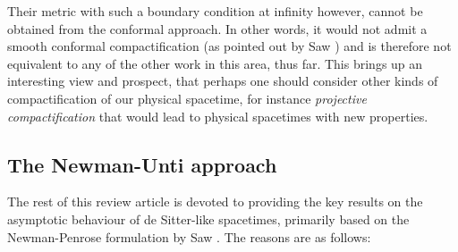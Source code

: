 \documentclass[aps,pre,preprint,superscriptaddress,showpacs,showkeys]{revtex4-1}
\begin{document}
Their metric with such a boundary condition at infinity however, cannot be obtained from the conformal approach. In other words, it would not admit a smooth conformal compactification (as pointed out by Saw \cite{Vee2017c}) and is therefore not equivalent to any of the other work in this area, thus far. This brings up an interesting view and prospect, that perhaps one should consider other kinds of compactification of our physical spacetime, for instance \emph{projective compactification} \cite{Rod} that would lead to physical spacetimes with new properties.

\subsection{The Newman-Unti approach}\label{Section1E}

The rest of this review article is devoted to providing the key results on the asymptotic behaviour of de Sitter-like spacetimes, primarily based on the Newman-Penrose formulation by Saw \cite{Vee2016,Vee2017,Vee2017b,Vee2017c}. The reasons are as follows:
\end{document}
